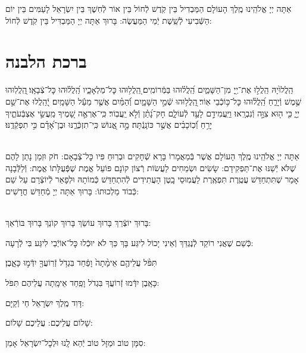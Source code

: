 \documentclass[twoside, openany, parskip=half, 11pt]{book}
\begin{document}
אַתָּה יְיָ אֱלֹהֵֽינוּ מֶֽלֶךְ הָעוֹלָם הַמַּבְדִיל בֵּין קֹֽדֶשׁ לְֿחוֹל בֵּין אוֹר לְֿחֽשֶׁךְ בֵּין יִשְׂרָאֵל לָעַמִּים בֵּין יוֹם הַשְּֿׁבִיעִי לְֿשֵֽׁשֶׁת יְֿמֵי הַמַּעֲשֶׂה: בָּרוּךְ אַתָּה יְיָ הַמַּבְדִּיל בֵּין קֹֽדֶשׁ לְֿחוֹל:
\clearpage

\vspace{-1.3\baselineskip}
\section[ברכת הלבנה]{ ברכת הלבנה }

הַֽלֲלוּ֙יָהּ הַֽלֲל֣וּ אֶת־יְ֖יָ מִן־הַשָּׁמַ֑יִם הַֽ֝לֲל֗וּהוּ בַּמְּֿרוֹמִֽים׃
֭הַֽלֲל֥וּהוּ כׇּל־מַלְאָכָ֑יו הַֽ֝לֲל֗וּהוּ כׇּל־צְֿבָאָֽו׃
֖הַֽלֲלֽוּהוּ שֶׁ֣מֶשׁ וְֿיָרֵ֑חַ הַֽ֝לֲל֗וּהוּ כׇּל־כּ֥וֹכְֿבֵי אֽוֹר׃
֖הַֽלֲל֥וּהוּ שְֿׁמֵ֣י הַשָּׁמָ֑יִם וְֿ֝הַמַּ֗יִם אֲשֶׁ֤ר מֵעַ֬ל הַשָּׁמָֽיִם׃
יְֿ֭הַֽלֲלוּ אֶת־שֵׁ֣ם יְיָ֑ כִּ֤י ה֖וּא צִוָּ֣ה וְֿנִבְרָֽאוּ׃
וַיַּֽעֲמִידֵ֣ם לָעַ֣ד לְֿעוֹלָ֑ם חָק־נָ֝תַ֗ן וְֿלֹ֣א יַֽעֲבֽוֹר׃
כִּֽי־אֶרְאֶ֣ה שָׁ֭מֶיךָ מַֽעֲשֵׂ֣י אֶצְבְּֿעֹתֶ֑יךָ יָרֵ֥חַ וְֿ֝כֽוֹכָבִ֗ים אֲשֶׁ֣ר כּוֹנָֽנְֿתָּה׃
מָ֣ה אֱ֭נוֹשׁ כִּֽי־תִזְכְּֿרֶ֑נּוּ וּבֶן־אָ֝דָ֗ם כִּ֣י תִפְקְֿדֶֽנּוּ׃

\\
אַתָּה יְיָ אֱלֹהֵֽינוּ מֶֽלֶךְ הָעוֹלָם אֲשֶׁר בְּֿמַאֲמָרוֹ בָּרָא שְֿׁחָקִים וּבְרֽוּחַ פִּיו כׇּל־צְֿבָאָם: חֹק וּזְמַן נָתַן לָהֶם שֶׁלֹּא יְֿשַׁנּוּ אֶת־תַּפְקִידָם: שָׂשִׂים וּשְׂמֵחִים לַעֲשׂוֹת רְֿצוֹן קוֹנָם פּוֹעֵל אֱמֶת שֶׁפְּֿעֻלָּתוֹ אֱמֶת: וְֿלַלְּֿבָנָה אָמַר שֶׁתִּתְחַדֵּשׁ עֲטֶֽרֶת תִּפְאֶֽרֶת לַעֲמֽוּסֵי בָֽטֶן הָעֲתִידִים לְֿהִתְחַדֵּשׁ כְּֿמוֹתָהּ וּלְפָאֵר לְֿיוֹצְֿרָם עַל שֵׁם כְּֿבוֹד מַלְכוּתוֹ: בָּרוּךְ אַתָּה יְיָ מְֿחַדֵּשׁ חֳדָשִׁים:

\\
בָּרוּךְ יוֹצְֿרֵךְ בָּרוּךְ עוֹשֵׂךְ בָּרוּךְ קוֹנֵךְ בָּרוּךְ בּוֹרְֿאֵךְ:

כְּֿשֵׁם שֶׁאֲנִי רוֹקֵד לְֿנֶגְדֵּךְ וְֿאֵינִי יָכוֹל לִיגַּע בָּךְ
כַּךְ לֹא יוּכְֿלוּ כׇּל־אוֹיְֿבַי לִיגַּע בִּי לְֿרָעָה:

תִּפֹּ֨ל עֲלֵיהֶ֤ם אֵימָ֨תָה֙ וָפַ֔חַד בִּגְדֹ֥ל זְֿרֽוֹעֲךָ֖ יִדְּֿמ֣וּ כָּאָ֑בֶן׃


כָּאָֽבֶן יִדְּֿמוּ זְֿרוֹעֲךָ בִּגְדֹל וָפַֽחַד אֵימָֽתָה עֲלֵיהֶם תִּפֹּל:


דָּוִד מֶֽלֶךְ יִשְׂרָאֵל חַי וְֿקַיָּם:

שָׁלוֹם עֲלֵיכֶם: \qquad {}
עֲלֵיכֶם שָׁלוֹם:


סִמָּן טוֹב וּמַזָּל טוֹב יְֿהֵא לָֽנוּ וּלְכׇל־יִשְׂרָאֵל אָמֵן:
\end{document}
